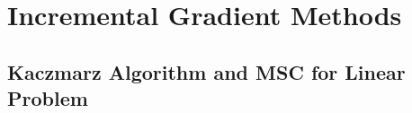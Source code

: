 \chapter{Incremental Gradient Methods} 

\section{Kaczmarz Algorithm and MSC for Linear Problem}




